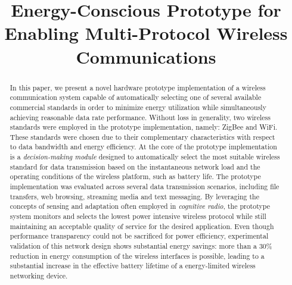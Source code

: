 \documentclass[conference]{IEEEtran}
\begin{document}
\title{Energy-Conscious Prototype for Enabling Multi-Protocol Wireless Communications}


\author{
}


\maketitle


\begin{abstract}
In this paper, we present a novel hardware prototype implementation
of a wireless communication system capable of automatically
selecting one of several available commercial standards in order to
minimize energy utilization while simultaneously achieving
reasonable data rate performance.  Without loss in generality, two
wireless standards were employed in the prototype implementation,
namely: ZigBee and WiFi.  These standards were chosen due to their
complementary characteristics with respect to data bandwidth and
energy efficiency.  At the core of the prototype implementation is a
{\it decision-making module} designed to automatically select the
most suitable wireless standard for data transmission based on the
instantaneous network load and the operating conditions of the
wireless platform, such as battery life.  The prototype
implementation was evaluated across several data transmission
scenarios, including file transfers, web browsing, streaming media
and text messaging.  By leveraging the concepts of sensing and
adaptation often employed in {\it cognitive radio}, the prototype
system monitors and selects the lowest power intensive wireless
protocol while still maintaining an acceptable quality of service
for the desired application.  Even though performance transparency
could not be sacrificed for power efficiency, experimental
validation of this network design shows substantial energy savings:
more than a 30\% reduction in energy consumption of the wireless
interfaces is possible, leading to a substantial increase in the
effective battery lifetime of a energy-limited wireless networking
device.
\end{abstract}
\end{document}
